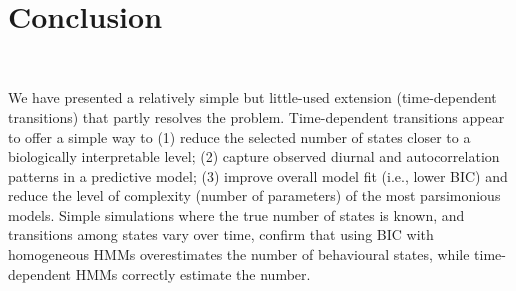 \documentclass{bmcart}
\begin{document}
\

\section{Conclusion}

\

We have presented a relatively simple but little-used extension
(time-dependent transitions) that partly resolves the problem.
Time-dependent transitions appear to offer a simple way to (1) reduce
the selected number of states closer to a biologically interpretable
level; (2) capture observed diurnal and autocorrelation patterns in a
predictive model; (3) improve overall model fit (i.e., lower BIC) and
reduce the level of complexity (number of parameters) of the most
parsimonious models. Simple simulations where the true number of
states is known, and transitions among states vary over time, confirm
that using BIC with homogeneous HMMs overestimates the number of
behavioural states, while time-dependent HMMs correctly estimate
the number.



\end{document}
